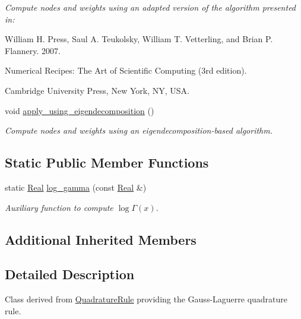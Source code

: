 \begin{DoxyCompactItemize}
\begin{DoxyCompactList}\small\item\em Compute nodes and weights using an adapted version of the algorithm presented in\-: \par
William H. Press, Saul A. Teukolsky, William T. Vetterling, and Brian P. Flannery. 2007. \par
Numerical Recipes\-: The Art of Scientific Computing (3rd edition). \par
Cambridge University Press, New York, N\-Y, U\-S\-A. \end{DoxyCompactList}\item 
\hypertarget{classGaussLaguerreRule_add3939f72a845e748c388220bb1ad934}{void \hyperlink{classGaussLaguerreRule_add3939f72a845e748c388220bb1ad934}{apply\-\_\-using\-\_\-eigendecomposition} ()}\label{classGaussLaguerreRule_add3939f72a845e748c388220bb1ad934}

\begin{DoxyCompactList}\small\item\em Compute nodes and weights using an eigendecomposition-\/based algorithm. \end{DoxyCompactList}\end{DoxyCompactItemize}
\subsection*{Static Public Member Functions}
\begin{DoxyCompactItemize}
\item 
static \hyperlink{typedefs_8h_a060b837c3b4486ee35317744156f3da2}{Real} \hyperlink{classGaussLaguerreRule_a0c297bfe019993090adc2df5aba866c7}{log\-\_\-gamma} (const \hyperlink{typedefs_8h_a060b837c3b4486ee35317744156f3da2}{Real} \&)
\begin{DoxyCompactList}\small\item\em Auxiliary function to compute $ \log\Gamma\left(x\right) $. \end{DoxyCompactList}\end{DoxyCompactItemize}
\subsection*{Additional Inherited Members}


\subsection{Detailed Description}
Class derived from \hyperlink{classQuadratureRule}{Quadrature\-Rule} providing the Gauss-\/\-Laguerre quadrature rule. 

